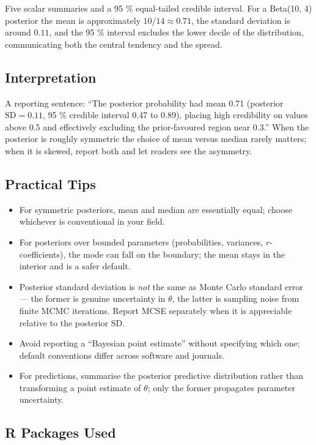 \documentclass[
]{article}
\providecommand{\tightlist}{%
  \setlength{\itemsep}{0pt}\setlength{\parskip}{0pt}}
\begin{document}
Five scalar summaries and a 95 \% equal-tailed credible interval. For a
Beta(10, 4) posterior the mean is approximately \(10/14 \approx 0.71\),
the standard deviation is around \(0.11\), and the 95 \% interval
excludes the lower decile of the distribution, communicating both the
central tendency and the spread.

\subsection{Interpretation}\label{interpretation}

A reporting sentence: ``The posterior probability had mean 0.71
(posterior \(\mathrm{SD} = 0.11\), 95 \% credible interval 0.47 to
0.89), placing high credibility on values above 0.5 and effectively
excluding the prior-favoured region near 0.3.'' When the posterior is
roughly symmetric the choice of mean versus median rarely matters; when
it is skewed, report both and let readers see the asymmetry.

\subsection{Practical Tips}\label{practical-tips}

\begin{itemize}
\tightlist
\item
  For symmetric posteriors, mean and median are essentially equal;
  choose whichever is conventional in your field.
\item
  For posteriors over bounded parameters (probabilities, variances,
  \(r\)-coefficients), the mode can fall on the boundary; the mean stays
  in the interior and is a safer default.
\item
  Posterior standard deviation is \emph{not} the same as Monte Carlo
  standard error --- the former is genuine uncertainty in \(\theta\),
  the latter is sampling noise from finite MCMC iterations. Report MCSE
  separately when it is appreciable relative to the posterior SD.
\item
  Avoid reporting a ``Bayesian point estimate'' without specifying which
  one; default conventions differ across software and journals.
\item
  For predictions, summarise the posterior predictive distribution
  rather than transforming a point estimate of \(\theta\); only the
  former propagates parameter uncertainty.
\end{itemize}

\subsection{R Packages Used}\label{r-packages-used}
\end{document}
